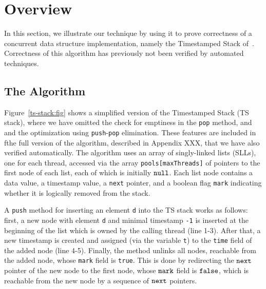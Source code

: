 \section{Overview}
\label{sec:overview}

In this section, we illustrate our technique by using it to prove correctness of
a concurrent data structure implementation, namely the Timestamped Stack
of~\cite{ts-stack}. Correctness of this algorithm has previously not been
verified by automated techniques.

\subsection{The Algorithm}



Figure~\ref{ts-stack:fig} shows a simplified version of the Timestamped Stack (TS stack), where we have omitted the check for emptiness in the {\tt pop} method, and and the optimization using {\tt push}-{\tt pop} elimination. These features are included in fthe full version of the algorithm, described in Appendix XXX, that we have also verified automatically. The algorithm uses an array of singly-linked lists (SLLs), one for each thread, accessed via the array {\tt pools[maxThreads]} of pointers to the first node of each list, each of which is initially ${\tt null}$. Each list node contains a data value, a timestamp value, a {\tt next} pointer, and a boolean flag {\tt mark} indicating whether it is logically removed from the stack.

A {\tt push} method for inserting an element {\tt d} into the TS stack works as follows: first, a new node with element {\tt d} and minimal timestamp {\tt -1} is inserted at the beginning of the list which is owned by the calling thread (line 1-3). After that, a new timestamp is created and assigned (via the variable {\tt t}) to the {\tt time} field of the added node (line 4-5).
Finally, the method unlinks all nodes, reachable from the added node, whose {\tt mark} field is {\tt true}. This is done by redirecting the $\tt next$ pointer of the new node to the first node, whose $\tt mark$ field is $\tt false$, which is
reachable from the new node by a sequence of $\tt next$ pointers.

